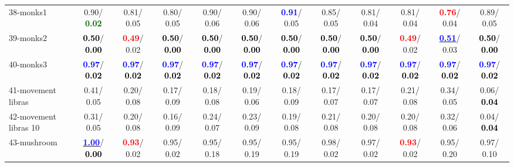 \begin{table}[h]
\begin{center}
{\begin{tabular}{lc|c|c|c|c|c|c|c|c|c|c}
38-monks1 &   0.90/\textcolor{darkgreen}{\textbf{  0.02}} &   0.81/  0.05 &   0.80/  0.05 &   0.90/  0.06 &   0.90/  0.06 & \textcolor{blue}{\textbf{  0.91}}/  0.05 &   0.85/  0.05 &   0.81/  0.04 &   0.81/  0.04 & \textcolor{red}{\textbf{  0.76}}/  0.04 &   0.89/  0.05 \\
39-monks2 & \textcolor{black}{\textbf{  0.50}}/\textcolor{black}{\textbf{  0.00}} & \textcolor{red}{\textbf{  0.49}}/  0.02 & \textcolor{black}{\textbf{  0.50}}/\textcolor{black}{\textbf{  0.00}} & \textcolor{black}{\textbf{  0.50}}/\textcolor{black}{\textbf{  0.00}} & \textcolor{black}{\textbf{  0.50}}/\textcolor{black}{\textbf{  0.00}} & \textcolor{black}{\textbf{  0.50}}/\textcolor{black}{\textbf{  0.00}} & \textcolor{black}{\textbf{  0.50}}/\textcolor{black}{\textbf{  0.00}} & \textcolor{black}{\textbf{  0.50}}/\textcolor{black}{\textbf{  0.00}} & \textcolor{red}{\textbf{  0.49}}/  0.02 & \underline{\textcolor{blue}{\textbf{  0.51}}}/  0.03 & \textcolor{black}{\textbf{  0.50}}/\textcolor{black}{\textbf{  0.00}} \\ \hline
40-monks3 & \textcolor{blue}{\textbf{  0.97}}/\textcolor{black}{\textbf{  0.02}} & \textcolor{blue}{\textbf{  0.97}}/\textcolor{black}{\textbf{  0.02}} & \textcolor{blue}{\textbf{  0.97}}/\textcolor{black}{\textbf{  0.02}} & \textcolor{blue}{\textbf{  0.97}}/\textcolor{black}{\textbf{  0.02}} & \textcolor{blue}{\textbf{  0.97}}/\textcolor{black}{\textbf{  0.02}} & \textcolor{blue}{\textbf{  0.97}}/\textcolor{black}{\textbf{  0.02}} & \textcolor{blue}{\textbf{  0.97}}/\textcolor{black}{\textbf{  0.02}} & \textcolor{blue}{\textbf{  0.97}}/\textcolor{black}{\textbf{  0.02}} & \textcolor{blue}{\textbf{  0.97}}/\textcolor{black}{\textbf{  0.02}} & \textcolor{blue}{\textbf{  0.97}}/\textcolor{black}{\textbf{  0.02}} & \textcolor{blue}{\textbf{  0.97}}/\textcolor{black}{\textbf{  0.02}} \\
41-movement libras &   0.41/  0.05 &   0.20/  0.08 &   0.17/  0.09 &   0.18/  0.08 &   0.19/  0.06 &   0.18/  0.09 &   0.17/  0.07 &   0.17/  0.07 &   0.21/  0.08 &   0.34/  0.05 &   0.06/\textcolor{black}{\textbf{  0.04}} \\
42-movement libras 10 &   0.31/  0.05 &   0.20/  0.08 &   0.16/  0.09 &   0.24/  0.07 &   0.23/  0.09 &   0.19/  0.08 &   0.21/  0.08 &   0.20/  0.08 &   0.20/  0.08 &   0.32/  0.06 &   0.04/\textcolor{black}{\textbf{  0.04}} \\
43-mushroom & \underline{\textcolor{blue}{\textbf{  1.00}}}/\textcolor{black}{\textbf{  0.00}} & \textcolor{red}{\textbf{  0.93}}/  0.02 &   0.95/  0.02 &   0.95/  0.18 &   0.95/  0.19 &   0.95/  0.19 &   0.98/  0.02 &   0.97/  0.02 & \textcolor{red}{\textbf{  0.93}}/  0.02 &   0.95/  0.20 &   0.97/  0.10 \\

\end{tabular}}
\end{center}
\end{table}
